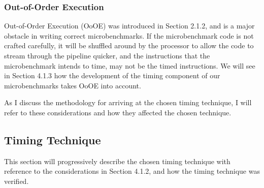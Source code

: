 \documentclass[bsc,frontabs,twoside,singlespacing,parskip,deptreport]{infthesis}     %
\begin{document}
{\subsubsection{Out-of-Order Execution}
{
Out-of-Order Execution (OoOE) was introduced in Section 2.1.2, and is a major obstacle in writing correct microbenchmarks. If the microbenchmark code is not crafted carefully, it will be shuffled around by the processor to allow the code to stream through the pipeline quicker, and the instructions that the microbenchmark intends to time, may not be the timed instructions. We will see in Section 4.1.3 how the development of the timing component of our microbenchmarks takes OoOE into account.
}

As I discuss the methodology for arriving at the chosen timing technique, I will refer to these considerations and how they affected the chosen technique.

}


\subsection{Timing Technique}
This section will progressively describe the chosen timing technique with reference to the considerations in Section 4.1.2, and how the timing technique was verified.
\end{document}
